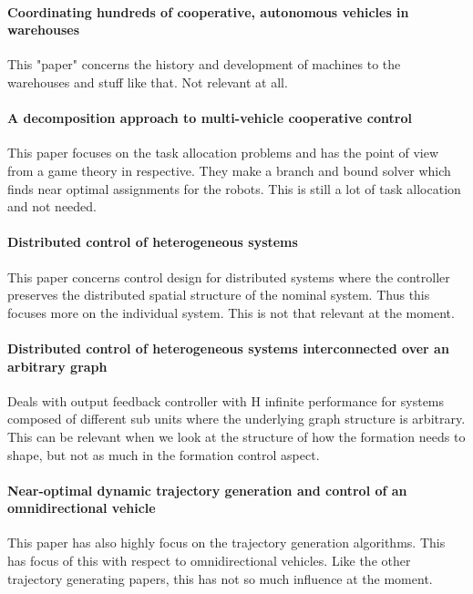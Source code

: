 {\vskip0pt\color{gray}
\paragraph{Coordinating hundreds of cooperative, autonomous vehicles in warehouses}
This "paper" concerns the history and development of machines to the warehouses and stuff like that.
Not relevant at all.}

{\vskip0pt\color{gray}
\paragraph{A decomposition approach to multi-vehicle cooperative control}
This paper focuses on the task allocation problems and has the point of view from a game theory in respective. They make a branch and bound solver which finds near optimal assignments for the robots.
This is still a lot of task allocation and not needed.}

{\vskip0pt\color{gray}
\paragraph{Distributed control of heterogeneous systems}
This paper concerns control design for distributed systems where the controller preserves the distributed spatial structure of the nominal system. Thus this focuses more on the individual system.
This is not that relevant at the moment.}

{\vskip0pt\color{gray}
\paragraph{Distributed control of heterogeneous systems interconnected over an arbitrary graph}
Deals with output feedback controller with H infinite performance for systems composed of different sub units where the underlying graph structure is arbitrary.
This can be relevant when we look at the structure of how the formation needs to shape, but not as much in the formation control aspect.}

\paragraph{Near-optimal dynamic trajectory generation and control of an omnidirectional vehicle}
This paper has also highly focus on the trajectory generation algorithms. This has focus of this with respect to omnidirectional vehicles.
Like the other trajectory generating papers, this has not so much influence at the moment.


